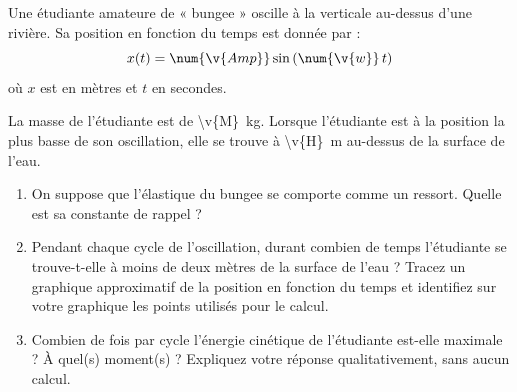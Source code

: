 
Une étudiante amateure de « bungee » oscille à la verticale au-dessus d'une rivière. Sa position en fonction du temps est donnée par :
\[ x(t) = \num{\v{Amp}} \sin\left(\num{\v{w}}\, t\right) \]
où $x$ est en mètres et $t$ en secondes.

La masse de l'étudiante est de \qty{\v{M}}{kg}. Lorsque l'étudiante est à la position la plus basse de son oscillation, elle se trouve à \qty{\v{H}}{m} au-dessus de la surface de l'eau.

\begin{enumerate}[label=\alph*)]
    \item On suppose que l'élastique du bungee se comporte comme un ressort. Quelle est sa constante de rappel ?
    \item Pendant chaque cycle de l'oscillation, durant combien de temps l'étudiante se trouve-t-elle à moins de deux mètres de la surface de l'eau ? Tracez un graphique approximatif de la position en fonction du temps et identifiez sur votre graphique les points utilisés pour le calcul.
    \item Combien de fois par cycle l'énergie cinétique de l'étudiante est-elle maximale ? À quel(s) moment(s) ? Expliquez votre réponse qualitativement, sans aucun calcul.
\end{enumerate}